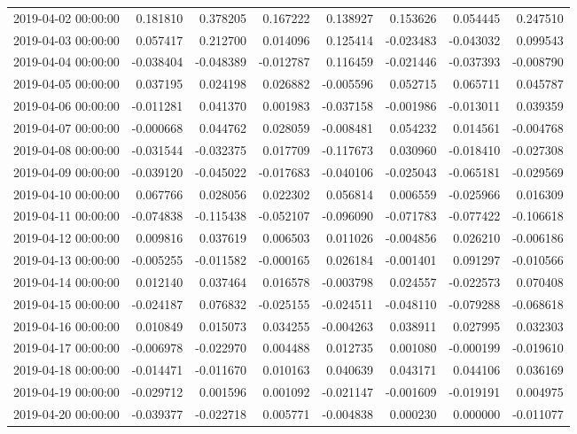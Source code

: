 \begin{tabular}{lrrrrrrr}
2019-04-02 00:00:00 & 0.181810 & 0.378205 & 0.167222 & 0.138927 & 0.153626 & 0.054445 & 0.247510 \\
2019-04-03 00:00:00 & 0.057417 & 0.212700 & 0.014096 & 0.125414 & -0.023483 & -0.043032 & 0.099543 \\
2019-04-04 00:00:00 & -0.038404 & -0.048389 & -0.012787 & 0.116459 & -0.021446 & -0.037393 & -0.008790 \\
2019-04-05 00:00:00 & 0.037195 & 0.024198 & 0.026882 & -0.005596 & 0.052715 & 0.065711 & 0.045787 \\
2019-04-06 00:00:00 & -0.011281 & 0.041370 & 0.001983 & -0.037158 & -0.001986 & -0.013011 & 0.039359 \\
2019-04-07 00:00:00 & -0.000668 & 0.044762 & 0.028059 & -0.008481 & 0.054232 & 0.014561 & -0.004768 \\
2019-04-08 00:00:00 & -0.031544 & -0.032375 & 0.017709 & -0.117673 & 0.030960 & -0.018410 & -0.027308 \\
2019-04-09 00:00:00 & -0.039120 & -0.045022 & -0.017683 & -0.040106 & -0.025043 & -0.065181 & -0.029569 \\
2019-04-10 00:00:00 & 0.067766 & 0.028056 & 0.022302 & 0.056814 & 0.006559 & -0.025966 & 0.016309 \\
2019-04-11 00:00:00 & -0.074838 & -0.115438 & -0.052107 & -0.096090 & -0.071783 & -0.077422 & -0.106618 \\
2019-04-12 00:00:00 & 0.009816 & 0.037619 & 0.006503 & 0.011026 & -0.004856 & 0.026210 & -0.006186 \\
2019-04-13 00:00:00 & -0.005255 & -0.011582 & -0.000165 & 0.026184 & -0.001401 & 0.091297 & -0.010566 \\
2019-04-14 00:00:00 & 0.012140 & 0.037464 & 0.016578 & -0.003798 & 0.024557 & -0.022573 & 0.070408 \\
2019-04-15 00:00:00 & -0.024187 & 0.076832 & -0.025155 & -0.024511 & -0.048110 & -0.079288 & -0.068618 \\
2019-04-16 00:00:00 & 0.010849 & 0.015073 & 0.034255 & -0.004263 & 0.038911 & 0.027995 & 0.032303 \\
2019-04-17 00:00:00 & -0.006978 & -0.022970 & 0.004488 & 0.012735 & 0.001080 & -0.000199 & -0.019610 \\
2019-04-18 00:00:00 & -0.014471 & -0.011670 & 0.010163 & 0.040639 & 0.043171 & 0.044106 & 0.036169 \\
2019-04-19 00:00:00 & -0.029712 & 0.001596 & 0.001092 & -0.021147 & -0.001609 & -0.019191 & 0.004975 \\
2019-04-20 00:00:00 & -0.039377 & -0.022718 & 0.005771 & -0.004838 & 0.000230 & 0.000000 & -0.011077 \\

\end{tabular}
